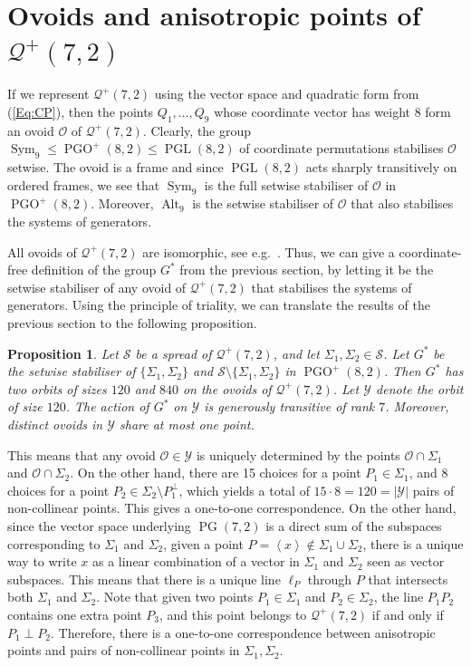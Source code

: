 \documentclass[10pt,a4paper]{amsart}
\newtheorem{prop}[thm]{Proposition}
\renewcommand{\leq}{\leqslant}
\newcommand{\vspan}[1]{\left \langle #1 \right \rangle}
\newcommand{\mo}{\mathcal O}
\newcommand{\mq}{\mathcal Q}
\newcommand{\ms}{\mathcal S}
\newcommand{\my}{\mathcal Y}
\DeclareMathOperator{\PG}{PG}
\newcommand{\pg}{\PG}
\DeclareMathOperator{\PGL}{PGL}
\DeclareMathOperator{\PGO}{PGO}
\DeclareMathOperator{\Sym}{Sym}
\DeclareMathOperator{\Alt}{Alt}
\begin{document}
\section{Ovoids and anisotropic points \texorpdfstring{of $\mq^+(7,2)$}{}}

If we represent $\mq^+(7,2)$ using the vector space and quadratic form from (\ref{Eq:CP}), then the points $Q_1, \dots, Q_9$ whose coordinate vector has weight 8 form an ovoid $\mo$ of $\mq^+(7,2)$.
Clearly, the group $\Sym_9 \leq \PGO^+(8,2) \leq \PGL(8,2)$ of coordinate permutations stabilises $\mo$ setwise.
The ovoid is a frame and since $\PGL(8,2)$ acts sharply transitively on ordered frames, we see that $\Sym_9$ is the full setwise stabiliser of $\mo$ in $\PGO^+(8,2)$.
Moreover, $\Alt_9$ is the setwise stabiliser of $\mo$ that also stabilises the systems of generators.

All ovoids of $\mq^+(7,2)$ are isomorphic, see e.g.\ \cite{Cameron:Praeger}.
Thus, we can give a coordinate-free definition of the group $G^*$ from the previous section, by letting it be the setwise stabiliser of any ovoid of $\mq^+(7,2)$ that stabilises the systems of generators.
Using the principle of triality, we can translate the results of the previous section to the following proposition.

\begin{prop}
 \label{Prop:by triality}
 Let $\ms$ be a spread of $\mq^+(7,2)$, and let $\Sigma_1, \Sigma_2 \in \ms$.
 Let $G^*$ be the setwise stabiliser of $\{\Sigma_1, \Sigma_2\}$ and $\ms \setminus \{\Sigma_1, \Sigma_2\}$ in $\PGO^+(8,2)$.
 Then $G^*$ has two orbits of sizes $120$ and $840$ on the ovoids of $\mq^+(7,2)$.
 Let $\my$ denote the orbit of size $120$.
 The action of $G^*$ on $\my$ is generously transitive of rank $7$.
 Moreover, distinct ovoids in $\my$ share at most one point.
\end{prop}

This means that any ovoid $\mo \in \my$ is uniquely determined by the points $\mo \cap \Sigma_1$ and $\mo \cap \Sigma_2$.
On the other hand, there are 15 choices for a point $P_1 \in \Sigma_1$, and 8 choices for a point $P_2 \in \Sigma_2 \setminus P_1^\perp$, which yields a total of $15 \cdot 8 = 120 = |\my|$ pairs of non-collinear points.
This gives a one-to-one correspondence.
On the other hand, since the vector space underlying $\pg(7,2)$ is a direct sum of the subspaces corresponding to $\Sigma_1$ and $\Sigma_2$, given a point $P = \vspan x \notin \Sigma_1 \cup \Sigma_2$, there is a unique way to write $x$ as a linear combination of a vector in $\Sigma_1$ and $\Sigma_2$ seen as vector subspaces.
This means that there is a unique line $\ell_P$ through $P$ that intersects both $\Sigma_1$ and $\Sigma_2$.
Note that given two points $P_1 \in \Sigma_1$ and $P_2 \in \Sigma_2$, the line $P_1 P_2$ contains one extra point $P_3$, and this point belongs to $\mq^+(7,2)$ if and only if $P_1 \perp P_2$.
Therefore, there is a one-to-one correspondence between anisotropic points and pairs of non-collinear points in $\Sigma_1, \Sigma_2$.
\end{document}
